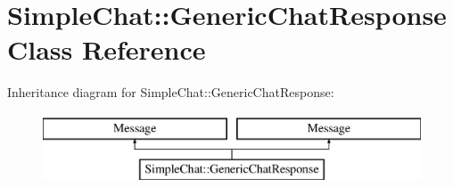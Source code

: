 \hypertarget{classSimpleChat_1_1GenericChatResponse}{\section{Simple\-Chat\-:\-:Generic\-Chat\-Response Class Reference}
\label{classSimpleChat_1_1GenericChatResponse}
}
Inheritance diagram for Simple\-Chat\-:\-:Generic\-Chat\-Response\-:\begin{figure}[H]
\begin{center}
\leavevmode
\includegraphics[height=2.000000cm]{classSimpleChat_1_1GenericChatResponse}
\end{center}
\end{figure}
